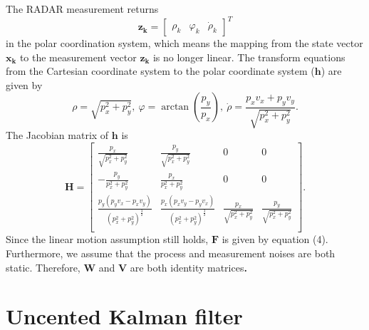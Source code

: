 \documentclass[12pt]{article}
\begin{document}
The RADAR measurement returns
%
\begin{equation}
	{\mathbf{z}_{\mathbf{k}} = \begin{bmatrix} \rho_{k} & \varphi_{k} & 	{\dot{\rho}}_{k} \end{bmatrix}}^{T}
\end{equation}
%
in the polar coordination system, which means the mapping from the state vector \(\mathbf{x}_{\mathbf{k}}\) to the measurement vector \(\mathbf{z}_{\mathbf{k}}\) is no longer linear. The transform equations from the Cartesian coordinate system to the polar coordinate system (\(\mathbf{h}\)) are given by
%
\begin{equation}
	\rho = \sqrt{p_x^{2} + p_y^{2}},\ \varphi = \arctan( \frac{p_y}{p_x}),\ 	\dot{\rho} = \frac{p_x v_x + p_y v_y}{\sqrt{p_x^{2} + p_y^{2}}}.
\end{equation}
%
The Jacobian matrix of \(\mathbf{h}\) is
%
\begin{equation}
	\renewcommand{\arraystretch}{1.5}
	\mathbf{H} = \begin{bmatrix}
	\frac{p_x}{\sqrt{p_x^{2} + p_y^{2}}} & \frac{p_y}{\sqrt{p_x^{2} + p_y^{2}}} & 0 & 0 \\
	 - \frac{p_y}{p_x^{2} + p_y^{2}} & \frac{p_x}{p_x^{2} + p_y^{2}} & 0 & 0 \\
	\frac{p_y( p_y v_x - p_x v_y)}{( p_x^{2} + p_y^{2})^{\frac{3}{2}}} & \frac{p_x( p_x v_y - p_y v_x)}{( p_x^{2} + p_y^{2})^{\frac{3}{2}}} & \frac{p_x}{\sqrt{p_x^{2} + p_y^{2}}} & \frac{p_y}{\sqrt{p_x^{2} + p_y^{2}}} \\
	\end{bmatrix}.
\end{equation}
%
Since the linear motion assumption still holds, \(\mathbf{F}\) is 
given by equation (4). Furthermore, we assume that the process and
measurement noises are both static. Therefore, \(\mathbf{W}\) and
\(\mathbf{V}\) are both identity matrices\textbf{.}


\section{Uncented Kalman filter}\label{uncented-kalman-filter}
\end{document}

